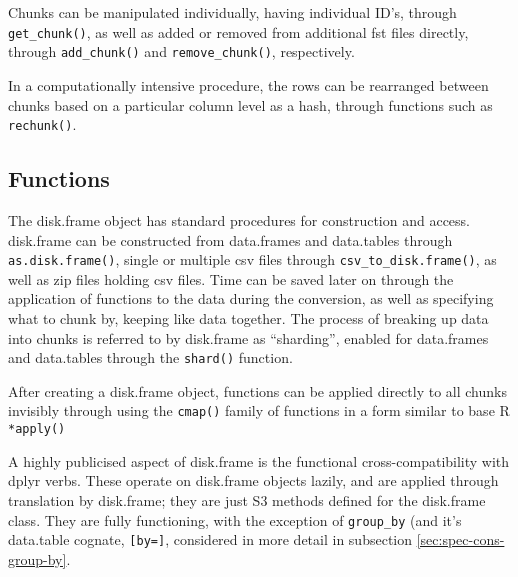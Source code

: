 \documentclass[a4paper,10pt]{article}
\begin{document}
Chunks can be manipulated individually, having individual ID's,
through \texttt{get\_chunk()}, as well as added or removed from
additional fst files directly, through \texttt{add\_chunk()} and
\texttt{remove\_chunk()}, respectively.

In a computationally intensive procedure, the rows can be rearranged
between chunks based on a particular column level as a hash, through
functions such as \texttt{rechunk()}.

\subsection{Functions}
\label{sec:functions}

The disk.frame object has standard procedures for construction and
access. disk.frame can be constructed from data.frames and data.tables
through \texttt{as.disk.frame()}, single or multiple csv files through
\texttt{csv\_to\_disk.frame()}, as well as zip files holding csv files.
Time can be saved later on through the application of functions to the
data during the conversion, as well as specifying what to chunk by,
keeping like data together. The process of breaking up data into
chunks is referred to by disk.frame as ``sharding'', enabled for
data.frames and data.tables through the \texttt{shard()} function.

After creating a disk.frame object, functions can be applied directly
to all chunks invisibly through using the \texttt{cmap()} family of
functions in a form similar to base R \texttt{*apply()}

A highly publicised aspect of disk.frame is the functional
cross-compatibility with dplyr verbs. These operate on disk.frame
objects lazily, and are applied through translation by disk.frame;
they are just S3 methods defined for the disk.frame class. They are
fully functioning, with the exception of \texttt{group\_by} (and it's
data.table cognate, \texttt{[by=]}, considered in more detail in
subsection \ref{sec:spec-cons-group-by}.
\end{document}
